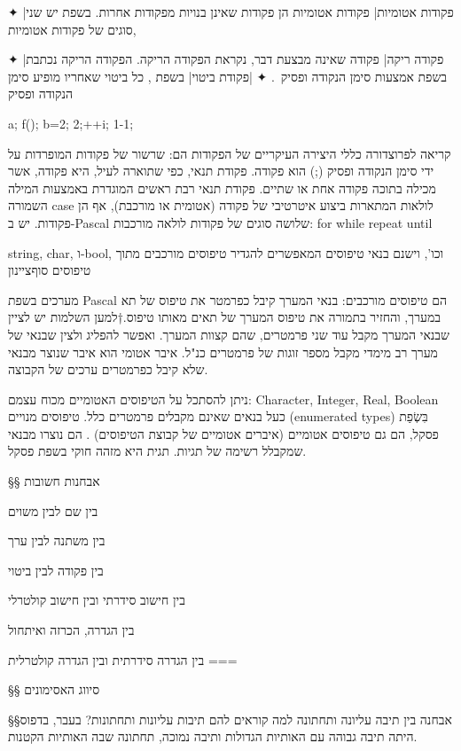 \begin{enumerate}
  ✦ \ע|פקודות אטומיות| פקודות אטומיות הן פקודות שאינן בנויות מפקודות אחרות. בשפת
   יש שני סוגים של פקודות אטומיות,
  \begin{enumerate}
    ✦ \ע|פקודה ריקה| פקודה שאינה מבצעת דבר, נקראת הפקודה הריקה. הפקודה הריקה נכתבת
    בשפת אמצעות סימן הנקודה ופסיק~\cc{;}.
    ✦ \ע|פקודת ביטוי| בשפת , כל ביטוי שאחריו מופיע סימן הנקודה ופסיק~\cc{;|}
    \begin{CPP}
      a; f(); b=2; 2;++i; 1-1;
    \end{CPP}
  \end{enumerate}
  קריאה לפרוצדורה
  כללי היצירה העיקריים של הפקודות הם:
  שרשור של פקודות המופרדות על ידי סימן הנקודה ופסיק (;) הוא פקודה.
  פקודת תנאי, כפי שתוארה לעיל, היא פקודה, אשר מכילה בתוכה פקודה אחת או שתיים.
  פקודת תנאי רבת ראשים המוגדרת באמצעות המילה השמורה case
  לולאות המתארות ביצוע איטרטיבי של פקודה (אטומית או מורכבת), אף הן פקודות. יש
  ב-Pascal שלושה סוגים של פקודות לולאה מורכבות: for
  while
  repeat until
\end{enumerate}

string, char, ו-bool,
וכו', וישנם בנאי טיפוסים המאפשרים להגדיר טיפוסים מורכבים מתוך טיפוסים
סוף{ציינון}

מערכים בשפת Pascal הם טיפוסים מורכבים: בנאי המערך קיבל כפרמטר את טיפוס של תא
במערך, והחזיר בתמורה את טיפוס המערך של תאים מאותו טיפוס.†{למען השלמות יש לציין
שבנאי המערך מקבל עוד שני פרמטרים, שהם קצוות המערך. ואפשר להפליג ולצין שבנאי של
מערך רב מימדי מקבל מספר זוגות של פרמטרים כנ"ל.}
איבר אטומי הוא איבר שנוצר מבנאי שלא קיבל כפרמטרים ערכים של הקבוצה.

ניתן להסתכל על הטיפוסים האטומיים מכוח עצמם: Character, Integer, Real, Boolean
כעל בנאים שאינם מקבלים פרמטרים כלל. טיפוסים מנויים (enumerated types) בִּשְׂפַת
פסקל, הם גם טיפוסים אטומיים (איברים אטומיים של קבוצת הטיפוסים) . הם נוצרו מבנאי
שמקבלל רשימה של תגיות. תגית היא מזהה חוקי בשפת פסקל.

§§ אבחנות חשובות
\item בין שם לבין משוים 
\item בין משתנה לבין ערך 
\item בין פקודה לבין ביטוי 
\item בין חישוב סידרתי ובין חישוב קולטרלי
\item  בין הגדרה, הכרזה ואיתחול
\item  בין הגדרה סידרתית ובין הגדרה קולטרלית 
===

§§ סיווג האסימונים 

§§אבחנה בין תיבה עליונה ותחתונה
למה קוראים להם תיבות עליונות ותחתונות? בעבר, בדפוס היתה תיבה גבוהה עם האותיות
הגדולות ותיבה נמוכה, תחתונה שבה האותיות הקטנות.

